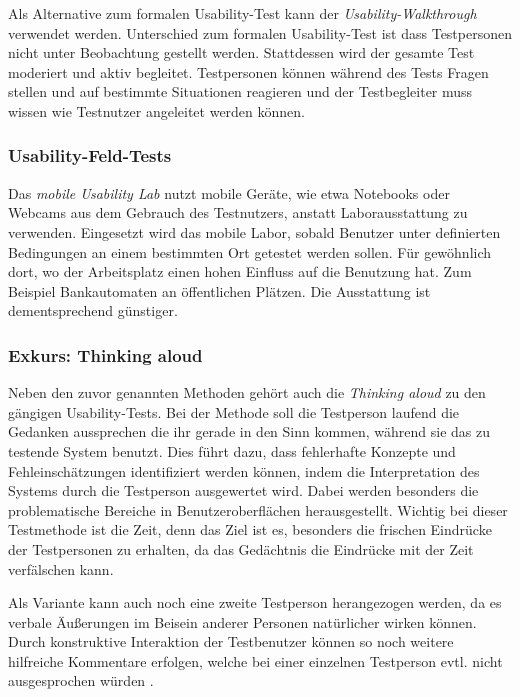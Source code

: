 Als Alternative zum formalen Usability-Test kann der \textit{Usability-Walkthrough} verwendet werden. 
Unterschied zum formalen Usability-Test ist dass Testpersonen nicht unter Beobachtung gestellt werden. 
Stattdessen wird der gesamte Test moderiert und aktiv begleitet. 
Testpersonen können während des Tests Fragen stellen und auf bestimmte Situationen reagieren und der Testbegleiter muss wissen wie Testnutzer angeleitet werden können.

\subsubsection{Usability-Feld-Tests}

Das \textit{mobile Usability Lab} nutzt mobile Geräte, wie etwa Notebooks oder Webcams aus dem Gebrauch des Testnutzers, anstatt Laborausstattung zu verwenden. 
Eingesetzt wird das mobile Labor, sobald Benutzer unter definierten Bedingungen an einem bestimmten Ort getestet werden sollen. 
Für gewöhnlich dort, wo der Arbeitsplatz einen hohen Einfluss auf die Benutzung hat. 
Zum Beispiel Bankautomaten an öffentlichen Plätzen. 
Die Ausstattung ist dementsprechend günstiger. 

\subsubsection{Exkurs: Thinking aloud\label{sec:thinking_aloud}}
Neben den zuvor genannten Methoden gehört auch die \emph{Thinking aloud} zu den gängigen Usability-Tests.
Bei der Methode soll die Testperson laufend die Gedanken aussprechen die ihr gerade in den Sinn kommen, während sie das zu testende System benutzt.
Dies führt dazu, dass fehlerhafte Konzepte und Fehleinschätzungen identifiziert werden können, indem die Interpretation des Systems durch die Testperson ausgewertet wird.
Dabei werden besonders die problematische Bereiche in Benutzeroberflächen herausgestellt.
Wichtig bei dieser Testmethode ist die Zeit, denn das Ziel ist es, besonders die frischen Eindrücke der Testpersonen zu erhalten, da das Gedächtnis die Eindrücke mit der Zeit verfälschen kann.

Als Variante kann auch noch eine zweite Testperson herangezogen werden, da es verbale Äußerungen im Beisein anderer Personen natürlicher wirken können.
Durch konstruktive Interaktion der Testbenutzer können so noch weitere hilfreiche Kommentare erfolgen, welche bei einer einzelnen Testperson evtl. nicht ausgesprochen würden \cite[vgl.][73\psq]{usability_engineering_software_developers}.



